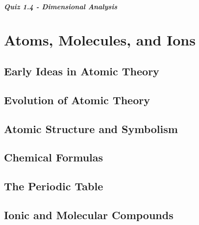 \documentclass[12pt, openany, letterpaper]{memoir}
\begin{document}
\paragraph*{Quiz 1.4 - Dimensional Analysis}

\chapter{Atoms, Molecules, and Ions}

\section{Early Ideas in Atomic Theory}

\section{Evolution of Atomic Theory}

\section{Atomic Structure and Symbolism}

\section{Chemical Formulas}

\section{The Periodic Table}

\section{Ionic and Molecular Compounds}
\end{document}
